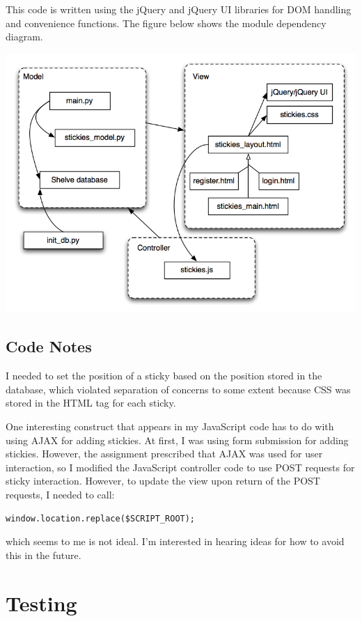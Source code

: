 \documentclass[11pt,letterpaper]{article}
\begin{document}
This code is written using the jQuery and jQuery UI libraries for DOM handling and convenience functions. The figure below shows the module dependency diagram.

\begin{center}
\includegraphics[width=400pt]{dot/moddep.png}
\label{fig:ob2} 
\end{center}
\subsection{Code Notes}
I needed to set the position of a sticky based on the position stored in the database, which violated separation of concerns to some extent because CSS was stored in the HTML tag for each sticky.

One interesting construct that appears in my JavaScript code has to do with using AJAX for adding stickies. At first, I was using form submission for adding stickies. However, the assignment prescribed that AJAX was used for user interaction, so I modified the JavaScript controller code to use POST requests for sticky interaction. However, to update the view upon return of the POST requests, I needed to call:
\begin{verbatim}
window.location.replace($SCRIPT_ROOT);
\end{verbatim}
which seems to me is not ideal. I'm interested in hearing ideas for how to avoid this in the future.

\section{Testing}
\end{document}
